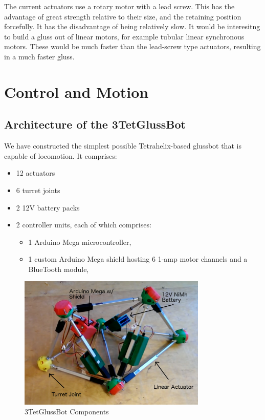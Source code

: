 \documentclass[12pt]{article}
\begin{document}
The current actuators use a rotary motor with a lead screw. This has the advantage of great
strength relative to their size, and the retaining position forcefully. It has the disadvantage
of being relatively slow. It would be interesitng to build a gluss out of linear motors, for
example tubular linear synchronous motors. These would be much faster than the lead-screw type
actuators, resulting in a much faster gluss. 

\section{Control and Motion}
\subsection{Architecture of the 3TetGlussBot}

We have constructed the simplest possible Tetrahelix-based glussbot that is capable of locomotion.
It comprises:
\begin{itemize}  
\item 12 actuators
\item 6 turret joints
\item 2 12V battery packs
\item 2 controller units, each of which comprises:
\begin{itemize}  
\item 1 Arduino Mega microcontroller,
\item 1 custom Arduino Mega shield hosting 6 1-amp motor channels and a BlueTooth module,
\end{itemize}  
\end{itemize}

\begin{figure}[!ht]
  \centering
    \includegraphics[width=0.8\textwidth]{3TetGlussBotPhotoAnnotated.png}
    \caption[3TetGlussBot Components]{3TetGlussBot Components}
      \label{annotated}
\end{figure}
\end{document}
